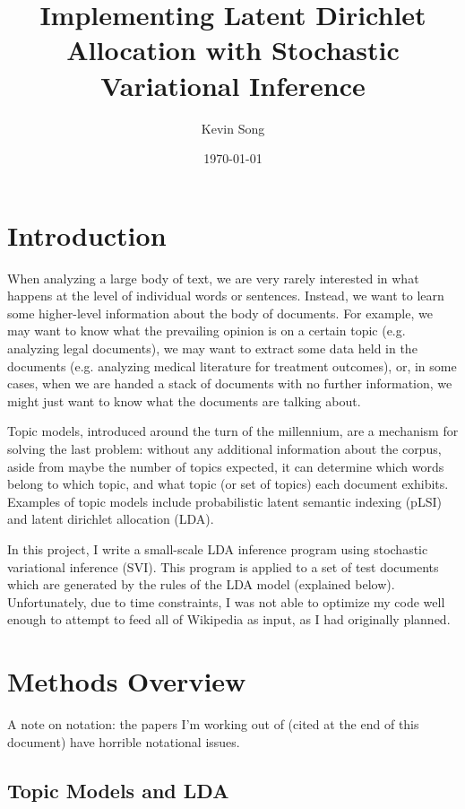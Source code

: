 \documentclass{article}
\author{Kevin Song}
\title{Implementing Latent Dirichlet Allocation with Stochastic Variational
  Inference}
\date{\today}
\begin{document}
\maketitle

\section{Introduction}

When analyzing a large body of text, we are very rarely interested in what
happens at the level of individual words or sentences. Instead, we want to
learn some higher-level information about the body of documents. For example, we
may want to know what the prevailing opinion is on a certain topic (e.g.
analyzing legal documents), we may want to extract some data held in the
documents (e.g. analyzing medical literature for treatment outcomes), or, in
some cases, when we are handed a stack of documents with no further information,
we might just want to know what the documents are talking about.

Topic models, introduced around the turn of the millennium, are a mechanism for
solving the last problem: without any additional information about the corpus,
aside from maybe the number of topics expected, it can determine which words
belong to which topic, and what topic (or set of topics) each document exhibits.
Examples of topic models include probabilistic latent semantic indexing (pLSI)
and latent dirichlet allocation (LDA).

In this project, I write a small-scale LDA inference program using stochastic
variational inference (SVI). This program is applied to a set of test documents which
are generated by the rules of the LDA model (explained below). Unfortunately,
due to time constraints, I was not able to optimize my code well enough to
attempt to feed all of Wikipedia as input, as I had originally planned.

\section{Methods Overview}

A note on notation: the papers I'm working out of (cited at the end of this
document) have horrible notational issues.

\subsection{Topic Models and LDA}
\end{document}
